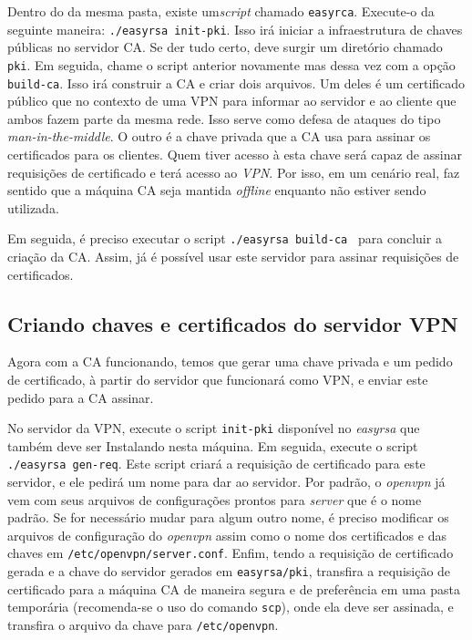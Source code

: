 \documentclass[12pt]{article}
\begin{document}
\begin{flushleft}
Dentro do da mesma pasta, existe um\emph{script} chamado \texttt{easyrca}. Execute-o da seguinte
maneira: \texttt{./easyrsa init-pki}. Isso irá iniciar a infraestrutura de chaves públicas no servidor CA.
Se der tudo certo, deve surgir um diretório chamado \texttt{pki}. Em seguida, chame o script anterior 
novamente mas dessa vez com a opção \texttt{build-ca}. Isso irá construir a CA e criar
dois arquivos. Um deles é um certificado público que no contexto de uma VPN para informar
ao servidor e ao cliente que ambos fazem parte da mesma rede. Isso serve como defesa de ataques 
do tipo \emph{man-in-the-middle}. O outro é a chave privada que a CA usa para assinar os certificados
para os clientes. Quem tiver acesso à esta chave será capaz de assinar requisições de certificado
e terá acesso ao \emph{VPN}. Por isso, em um cenário real, faz sentido que a máquina CA seja mantida \emph{offline}
enquanto não estiver sendo utilizada.

Em seguida, é preciso executar o script \texttt{./easyrsa build-ca } para concluir a criação da CA. Assim, já 
é possível usar este servidor para assinar requisições de certificados. 

\subsection{Criando chaves e certificados do servidor VPN}

Agora com a CA funcionando, temos que gerar uma chave privada e um pedido de certificado, à partir do servidor
que funcionará como VPN, e enviar este pedido para a CA assinar. 

No servidor da VPN, execute o script \texttt{init-pki} disponível no \emph{easyrsa} que também deve ser Instalando
nesta máquina. Em seguida, execute o script \texttt{./easyrsa gen-req}. Este script criará a requisição de certificado
para este servidor, e ele pedirá um nome para dar ao servidor. Por padrão, o \emph{openvpn} já vem com seus arquivos
de configurações prontos para \emph{server} que é o nome padrão. Se for necessário mudar para algum outro nome, é preciso
modificar os arquivos de configuração do \emph{openvpn} assim como o nome dos certificados e das chaves em \texttt{/etc/openvpn/server.conf}.
Enfim, tendo a requisição de certificado gerada e a chave do servidor gerados em \texttt{easyrsa/pki}, transfira a requisição
de certificado para a máquina CA de maneira segura e de preferência em uma pasta temporária (recomenda-se o uso do comando \texttt{scp}), onde ela deve ser assinada, e 
transfira o arquivo da chave para \texttt{/etc/openvpn}.


\end{flushleft}
\end{document}
